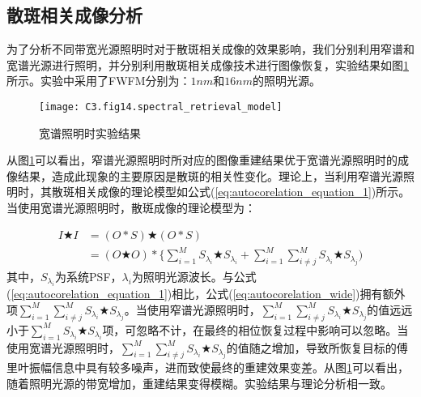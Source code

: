 \subsection{散斑相关成像分析}
为了分析不同带宽光源照明时对于散斑相关成像的效果影响，我们分别利用窄谱和宽谱光源进行照明，并分别利用散斑相关成像技术进行图像恢复，实验结果如图\ref{fig:3.13}所示。实验中采用了FWFM分别为：$1nm$和$16nm$的照明光源。
\begin{figure}[htp]
	\centering
	\texttt{[image: C3.fig14.spectral\_retrieval\_model]}
	\caption{宽谱照明时实验结果}
	\label{fig:3.13}
\end{figure}
从图\ref{fig:3.13}可以看出，窄谱光源照明时所对应的图像重建结果优于宽谱光源照明时的成像结果，造成此现象的主要原因是散斑的相关性变化。理论上，当利用窄谱光源照明时，其散斑相关成像的理论模型如公式(\ref{eq:autocorelation_equation_1})所示。当使用宽谱光源照明时，散斑成像的理论模型为：

\begin{equation}
\begin{aligned}
    I \bigstar I  &= (O*S) \bigstar (O*S) \\
		              &=  (O \bigstar O)*\{\sum_{i=1}^{M} S_{\lambda_i} \bigstar S_{\lambda_i}+ \sum_{i=1}^{M}\sum_{i \ne j}^{M} S_{\lambda_i} \bigstar S_{\lambda_j})
\end{aligned}
\label{eq:autocorelation_wide}
\end{equation}
其中，$S_{\lambda_i}$为系统PSF，$\lambda_i$为照明光源波长。与公式(\ref{eq:autocorelation_equation_1})相比，公式(\ref{eq:autocorelation_wide})拥有额外项$\sum_{i=1}^{M}\sum_{i \ne j}^{M} S_{\lambda_i} \bigstar S_{\lambda_j}$。当使用窄谱光源照明时，$\sum_{i=1}^{M}\sum_{i \ne j}^{M} S_{\lambda_i} \bigstar S_{\lambda_j}$的值远远小于$\sum_{i=1}^{M} S_{\lambda_i} \bigstar S_{\lambda_i}$项，可忽略不计，在最终的相位恢复过程中影响可以忽略。当使用宽谱光源照明时，$\sum_{i=1}^{M}\sum_{i \ne j}^{M} S_{\lambda_i} \bigstar S_{\lambda_j}$的值随之增加，导致所恢复目标的傅里叶振幅信息中具有较多噪声，进而致使最终的重建效果变差。从图\ref{fig:3.13}可以看出，随着照明光源的带宽增加，重建结果变得模糊。实验结果与理论分析相一致。
